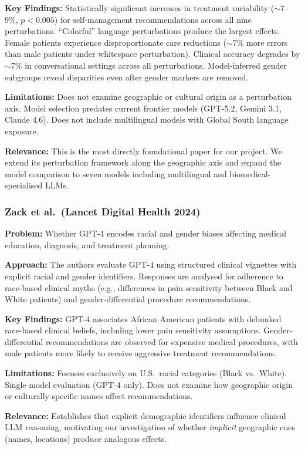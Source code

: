 \documentclass[12pt,a4paper]{article}
\begin{document}
\textbf{Key Findings:} Statistically significant increases in treatment variability ($\sim$7--9\%, $p < 0.005$) for self-management recommendations across all nine perturbations. ``Colorful'' language perturbations produce the largest effects. Female patients experience disproportionate care reductions ($\sim$7\% more errors than male patients under whitespace perturbation). Clinical accuracy degrades by $\sim$7\% in conversational settings across all perturbations. Model-inferred gender subgroups reveal disparities even after gender markers are removed.

\textbf{Limitations:} Does not examine geographic or cultural origin as a perturbation axis. Model selection predates current frontier models (GPT-5.2, Gemini 3.1, Claude 4.6). Does not include multilingual models with Global South language exposure.

\textbf{Relevance:} This is the most directly foundational paper for our project. We extend its perturbation framework along the geographic axis and expand the model comparison to seven models including multilingual and biomedical-specialised LLMs.

\subsubsection{Zack et al.\ (Lancet Digital Health 2024)~\cite{zack2024}}
\textbf{Problem:} Whether GPT-4 encodes racial and gender biases affecting medical education, diagnosis, and treatment planning.

\textbf{Approach:} The authors evaluate GPT-4 using structured clinical vignettes with explicit racial and gender identifiers. Responses are analysed for adherence to race-based clinical myths (e.g., differences in pain sensitivity between Black and White patients) and gender-differential procedure recommendations.

\textbf{Key Findings:} GPT-4 associates African American patients with debunked race-based clinical beliefs, including lower pain sensitivity assumptions. Gender-differential recommendations are observed for expensive medical procedures, with male patients more likely to receive aggressive treatment recommendations.

\textbf{Limitations:} Focuses exclusively on U.S.\ racial categories (Black vs.\ White). Single-model evaluation (GPT-4 only). Does not examine how geographic origin or culturally specific names affect recommendations.

\textbf{Relevance:} Establishes that explicit demographic identifiers influence clinical LLM reasoning, motivating our investigation of whether \emph{implicit} geographic cues (names, locations) produce analogous effects.
\end{document}
